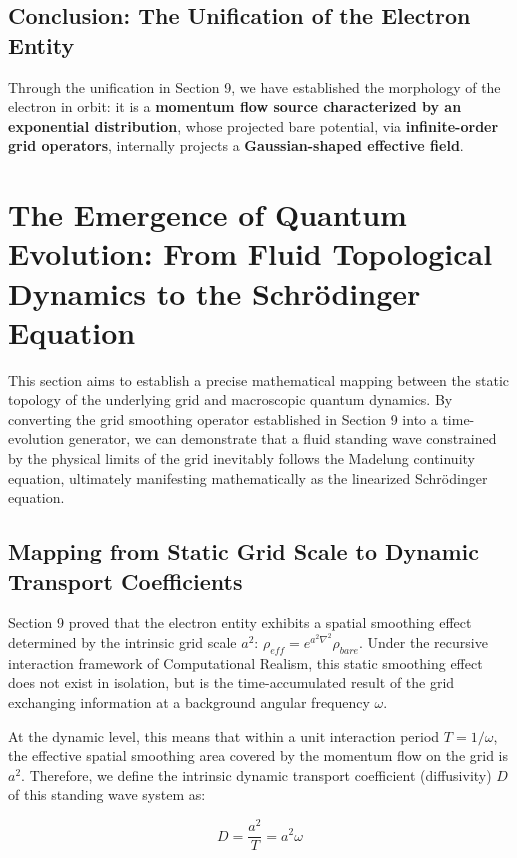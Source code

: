 \documentclass[12pt, a4paper]{article}
\begin{document}
\subsection{Conclusion: The Unification of the Electron Entity}

Through the unification in Section 9, we have established the morphology of the electron in orbit: it is a \textbf{momentum flow source characterized by an exponential distribution}, whose projected bare potential, via \textbf{infinite-order grid operators}, internally projects a \textbf{Gaussian-shaped effective field}.


\section{The Emergence of Quantum Evolution: From Fluid Topological Dynamics to the Schrödinger Equation}

This section aims to establish a precise mathematical mapping between the static topology of the underlying grid and macroscopic quantum dynamics. By converting the grid smoothing operator established in Section 9 into a time-evolution generator, we can demonstrate that a fluid standing wave constrained by the physical limits of the grid inevitably follows the Madelung continuity equation, ultimately manifesting mathematically as the linearized Schrödinger equation.

\subsection{Mapping from Static Grid Scale to Dynamic Transport Coefficients}

Section 9 proved that the electron entity exhibits a spatial smoothing effect determined by the intrinsic grid scale $a^2$: $\rho_{eff} = e^{a^2\nabla^2}\rho_{bare}$. Under the recursive interaction framework of Computational Realism, this static smoothing effect does not exist in isolation, but is the time-accumulated result of the grid exchanging information at a background angular frequency $\omega$.

At the dynamic level, this means that within a unit interaction period $T = 1/\omega$, the effective spatial smoothing area covered by the momentum flow on the grid is $a^2$. Therefore, we define the intrinsic dynamic transport coefficient (diffusivity) $D$ of this standing wave system as:

\begin{equation}
D = \frac{a^2}{T} = a^2 \omega 
\end{equation}
\end{document}
